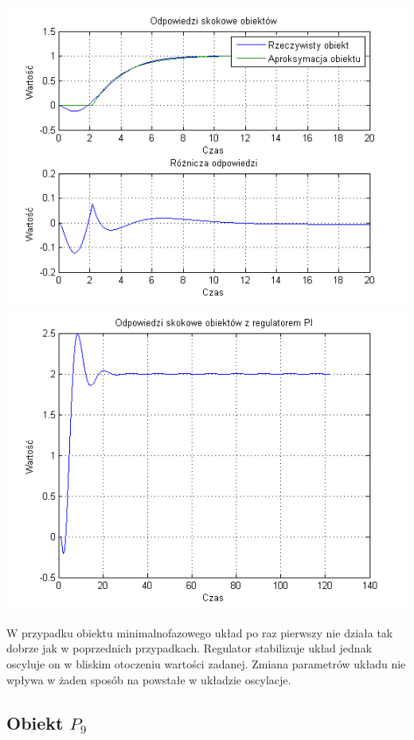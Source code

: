 \documentclass[10pt,a4paper]{article}
\begin{document}
\begin{center}
\includegraphics[scale=1]{images/jeden/skrypt_245.png}\\
\includegraphics[scale=1]{images/jeden/skrypt_246.png}\\
\end{center}
\newpage
W przypadku obiektu minimalnofazowego układ po raz pierwszy nie działa tak dobrze jak w poprzednich przypadkach. Regulator stabilizuje układ jednak oscyluje on w bliskim otoczeniu wartości zadanej. Zmiana parametrów układu nie wpływa w żaden sposób na powstałe w układzie oscylacje.
\newpage
\subsection{Obiekt $P_9$}
\end{document}
